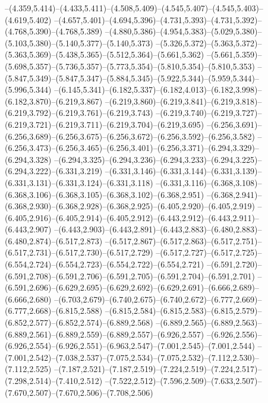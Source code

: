   --(4.359,5.414)--(4.433,5.411)--(4.508,5.409)--(4.545,5.407)--(4.545,5.403)--(4.619,5.402)%
  --(4.657,5.401)--(4.694,5.396)--(4.731,5.393)--(4.731,5.392)--(4.768,5.390)--(4.768,5.389)%
  --(4.880,5.386)--(4.954,5.383)--(5.029,5.380)--(5.103,5.380)--(5.140,5.377)--(5.140,5.373)%
  --(5.326,5.372)--(5.363,5.372)--(5.363,5.369)--(5.438,5.365)--(5.512,5.364)--(5.661,5.362)%
  --(5.661,5.359)--(5.698,5.357)--(5.736,5.357)--(5.773,5.354)--(5.810,5.354)--(5.810,5.353)%
  --(5.847,5.349)--(5.847,5.347)--(5.884,5.345)--(5.922,5.344)--(5.959,5.344)--(5.996,5.344)%
  --(6.145,5.341)--(6.182,5.337)--(6.182,4.013)--(6.182,3.998)--(6.182,3.870)--(6.219,3.867)%
  --(6.219,3.860)--(6.219,3.841)--(6.219,3.818)--(6.219,3.792)--(6.219,3.761)--(6.219,3.743)%
  --(6.219,3.740)--(6.219,3.727)--(6.219,3.721)--(6.219,3.711)--(6.219,3.704)--(6.219,3.695)%
  --(6.256,3.691)--(6.256,3.689)--(6.256,3.675)--(6.256,3.672)--(6.256,3.592)--(6.256,3.582)%
  --(6.256,3.473)--(6.256,3.465)--(6.256,3.401)--(6.256,3.371)--(6.294,3.329)--(6.294,3.328)%
  --(6.294,3.325)--(6.294,3.236)--(6.294,3.233)--(6.294,3.225)--(6.294,3.222)--(6.331,3.219)%
  --(6.331,3.146)--(6.331,3.144)--(6.331,3.139)--(6.331,3.131)--(6.331,3.124)--(6.331,3.118)%
  --(6.331,3.116)--(6.368,3.108)--(6.368,3.106)--(6.368,3.105)--(6.368,3.102)--(6.368,2.951)%
  --(6.368,2.941)--(6.368,2.930)--(6.368,2.928)--(6.368,2.925)--(6.405,2.920)--(6.405,2.919)%
  --(6.405,2.916)--(6.405,2.914)--(6.405,2.912)--(6.443,2.912)--(6.443,2.911)--(6.443,2.907)%
  --(6.443,2.903)--(6.443,2.891)--(6.443,2.883)--(6.480,2.883)--(6.480,2.874)--(6.517,2.873)%
  --(6.517,2.867)--(6.517,2.863)--(6.517,2.751)--(6.517,2.731)--(6.517,2.730)--(6.517,2.729)%
  --(6.517,2.727)--(6.517,2.725)--(6.554,2.724)--(6.554,2.723)--(6.554,2.722)--(6.554,2.721)%
  --(6.591,2.720)--(6.591,2.708)--(6.591,2.706)--(6.591,2.705)--(6.591,2.704)--(6.591,2.701)%
  --(6.591,2.696)--(6.629,2.695)--(6.629,2.692)--(6.629,2.691)--(6.666,2.689)--(6.666,2.680)%
  --(6.703,2.679)--(6.740,2.675)--(6.740,2.672)--(6.777,2.669)--(6.777,2.668)--(6.815,2.588)%
  --(6.815,2.584)--(6.815,2.583)--(6.815,2.579)--(6.852,2.577)--(6.852,2.574)--(6.889,2.568)%
  --(6.889,2.565)--(6.889,2.563)--(6.889,2.561)--(6.889,2.559)--(6.889,2.557)--(6.926,2.557)%
  --(6.926,2.556)--(6.926,2.554)--(6.926,2.551)--(6.963,2.547)--(7.001,2.545)--(7.001,2.544)%
  --(7.001,2.542)--(7.038,2.537)--(7.075,2.534)--(7.075,2.532)--(7.112,2.530)--(7.112,2.525)%
  --(7.187,2.521)--(7.187,2.519)--(7.224,2.519)--(7.224,2.517)--(7.298,2.514)--(7.410,2.512)%
  --(7.522,2.512)--(7.596,2.509)--(7.633,2.507)--(7.670,2.507)--(7.670,2.506)--(7.708,2.506)%
